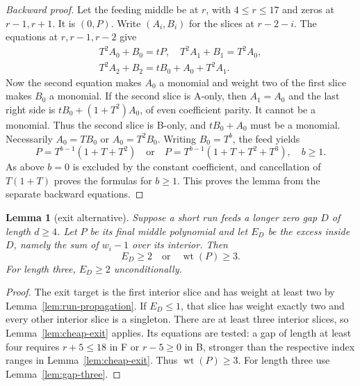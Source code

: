 \documentclass{article}
\newtheorem{lemma}{Lemma}
\DeclareMathOperator{\wt}{wt}
\begin{document}
\begin{proof}[Backward proof]
  Let the feeding middle be at \(r\), with \(4 \le r \le 17\) and
  zeros at \(r - 1, r + 1\). It is \((0, P)\). Write \((A_i, B_i)\) for the slices at
  \(r - 2 - i\). The equations at \(r, r - 1, r - 2\) give
  \begin{equation}\label{eq:cheap-backward}
    \begin{gathered}
      T^2 A_0 + B_0 = tP, \quad T^2 A_1 + B_1 = T^2 A_0, \\
      T^2 A_2 + B_2 = t B_0 + A_0 + T^2 A_1.
    \end{gathered}
  \end{equation}
  Now the second equation makes \(A_0\) a monomial and weight two of the first
  slice makes \(B_0\) a monomial. If the second slice is A-only, then \(A_1 = A_0\)
  and the last right side is \(t B_0 + (1 + T^2) A_0\), of even coefficient parity.
  It cannot be a monomial. Thus the second slice is B-only, and \(t B_0 + A_0\)
  must be a monomial. Necessarily \(A_0 = T B_0\) or \(A_0 = T^2 B_0\).
  Writing \(B_0 = T^b\), the feed yields
  \begin{equation}
    P = T^{b-1} (1 + T + T^2) \quad \text{or} \quad
    P = T^{b-1} (1 + T + T^2 + T^3), \quad b \ge 1.
  \end{equation}
  As above \(b = 0\) is excluded by the constant coefficient, and cancellation
  of \(T(1 + T)\) proves the formulas for \(b \ge 1\). This proves the lemma from the
  separate backward equations.
\end{proof}

\begin{lemma}[exit alternative]\label{lem:exit-alternative}
  Suppose a short run feeds a longer zero gap
  \(D\) of length \(d \ge 4\). Let \(P\) be its final middle polynomial and let
  \(E_D\) be the excess inside \(D\), namely the sum of \(w_i - 1\) over its interior.
  Then
  \begin{equation}\label{eq:exit-alternative}
    E_D \ge 2 \quad \text{or} \quad \wt(P) \ge 3.
  \end{equation}
  For length three, \(E_D \ge 2\) unconditionally.
\end{lemma}

\begin{proof}
  The exit target is the first interior slice and has weight at
  least two by Lemma~\ref{lem:run-propagation}. If \(E_D \le 1\), that slice has weight exactly
  two and every other interior slice is a singleton. There are at least three
  interior slices, so Lemma~\ref{lem:cheap-exit} applies. Its equations are tested: a gap of
  length at least four requires \(r + 5 \le 18\) in F or \(r - 5 \ge 0\) in B, stronger
  than the respective index ranges in Lemma~\ref{lem:cheap-exit}. Thus \(\wt(P) \ge 3\).
  For length three use Lemma~\ref{lem:gap-three}.
\end{proof}
\end{document}
